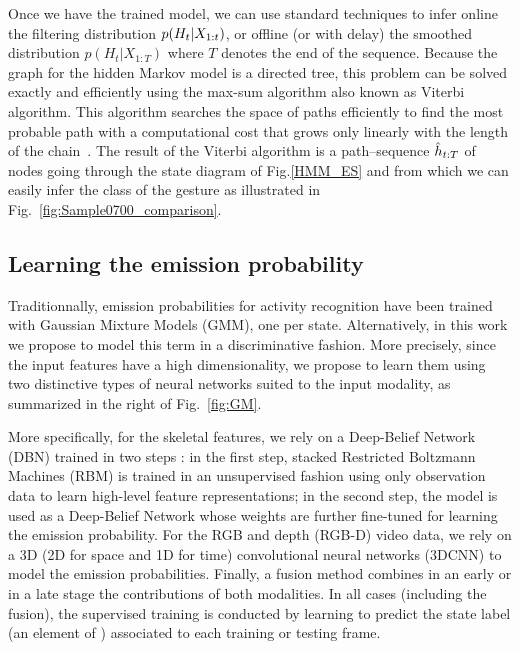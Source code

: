 Once we have the trained model, we can use standard techniques to infer online the filtering
distribution $p(H_t | X_{1:t})$,  or offline (or with delay)
the smoothed distribution $p(H_t | X_{1:T})$ where $T$ denotes the end of the sequence.
Because the graph for the hidden Markov model is a directed tree, this problem can be solved exactly and efficiently using the max-sum algorithm also known as Viterbi algorithm. This algorithm searches the space of paths efficiently to find the most probable path with a computational cost that grows only linearly with the length of the chain~\cite{bishop2006pattern}.
The result of the Viterbi algorithm is a path--sequence $\hat{h}_{t:T}$ of nodes going through the state diagram of
Fig.\ref{HMM_ES} and from which we can easily infer the class of the gesture as illustrated in Fig.~\ref{fig:Sample0700_comparison}.



\subsection{Learning the emission probability \emissionprob{}}
\label{sec:ProblemFormation}
\label{sec:emissionprob}

Traditionnally, emission probabilities for activity recognition have been trained with Gaussian Mixture Models (GMM), one per state.
%
Alternatively, in this work we propose to model this term in a discriminative fashion.
More precisely, since the input features have a high dimensionality,
we propose to learn them using two distinctive types of neural networks suited to the input modality,
as summarized in the right of Fig.~\ref{fig:GM}.
%

More specifically, for  the skeletal features, we rely on a Deep-Belief Network (DBN) trained in two steps \cite{salakhutdinov2009learning}:
in the first step,  stacked Restricted Boltzmann Machines (RBM) is trained in an unsupervised fashion using only observation data
to learn  high-level feature representations;
in the second step, the model is used as a Deep-Belief Network whose weights are further fine-tuned
for learning the emission probability.
%
For the RGB and depth (RGB-D) video data, we rely on a 3D (2D for space and 1D for time)
convolutional neural networks (3DCNN) to model the emission probabilities.
%
Finally, a fusion method combines in an early or in a late stage the contributions of both modalities.
%
In all cases (including the fusion), the supervised training is conducted by learning to
predict the state label (an element of \finiteset) associated to each training or testing frame.


